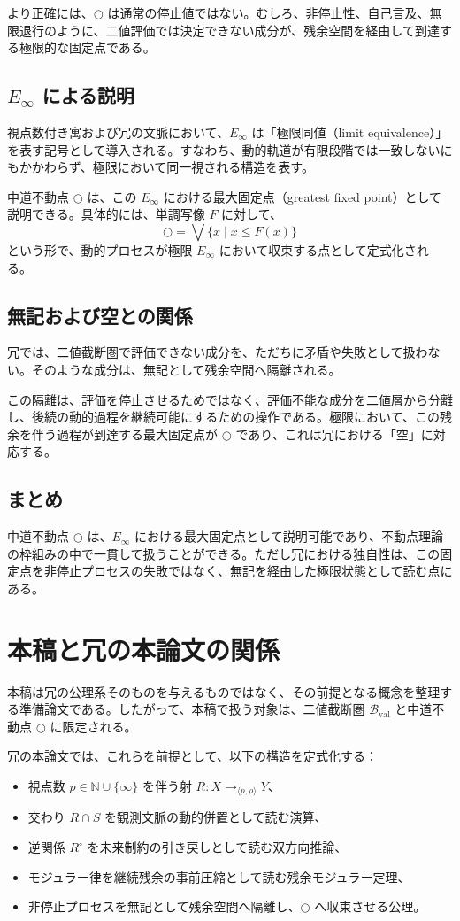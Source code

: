 \documentclass[a4paper,11pt]{article}
\newcommand{\dfix}{\bigcirc}
\begin{document}
より正確には、$\dfix$ は通常の停止値ではない。むしろ、非停止性、自己言及、無限退行のように、二値評価では決定できない成分が、残余空間を経由して到達する極限的な固定点である。

\subsection{\texorpdfstring{$E_\infty$}{E∞} による説明}
視点数付き寓および冗の文脈において、$E_\infty$ は「極限同値（limit equivalence）」を表す記号として導入される。すなわち、動的軌道が有限段階では一致しないにもかかわらず、極限において同一視される構造を表す。

中道不動点 $\dfix$ は、この $E_\infty$ における最大固定点（greatest fixed point）として説明できる。具体的には、単調写像 $F$ に対して、
\[
\dfix = \bigvee \{ x \mid x \le F(x) \}
\]
という形で、動的プロセスが極限 $E_\infty$ において収束する点として定式化される。

\subsection{無記および空との関係}
冗では、二値截断圏で評価できない成分を、ただちに矛盾や失敗として扱わない。そのような成分は、無記として残余空間へ隔離される。

この隔離は、評価を停止させるためではなく、評価不能な成分を二値層から分離し、後続の動的過程を継続可能にするための操作である。極限において、この残余を伴う過程が到達する最大固定点が $\dfix$ であり、これは冗における「空」に対応する。

\subsection{まとめ}
中道不動点 $\dfix$ は、$E_\infty$ における最大固定点として説明可能であり、不動点理論の枠組みの中で一貫して扱うことができる。ただし冗における独自性は、この固定点を非停止プロセスの失敗ではなく、無記を経由した極限状態として読む点にある。

\section{本稿と冗の本論文の関係}
本稿は冗の公理系そのものを与えるものではなく、その前提となる概念を整理する準備論文である。したがって、本稿で扱う対象は、二値截断圏 $\mathcal{B}_{\mathrm{val}}$ と中道不動点 $\dfix$ に限定される。

冗の本論文では、これらを前提として、以下の構造を定式化する：
\begin{itemize}
\item 視点数 $p \in \mathbb{N} \cup \{\infty\}$ を伴う射 $R: X \to_{\langle p, \rho \rangle} Y$、
\item 交わり $R \cap S$ を観測文脈の動的併置として読む演算、
\item 逆関係 $R^\circ$ を未来制約の引き戻しとして読む双方向推論、
\item モジュラー律を継続残余の事前圧縮として読む残余モジュラー定理、
\item 非停止プロセスを無記として残余空間へ隔離し、$\dfix$ へ収束させる公理。
\end{itemize}
\end{document}
